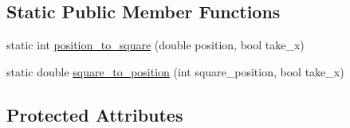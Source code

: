 \subsection*{Static Public Member Functions}
\begin{DoxyCompactItemize}
\item 
static int \hyperlink{classc__character_ae5c54984450cd668f8caff08bab773b9}{position\-\_\-to\-\_\-square} (double position, bool take\-\_\-x)
\item 
static double \hyperlink{classc__character_aef52e1c8a40484d9441867d10aa05b5f}{square\-\_\-to\-\_\-position} (int square\-\_\-position, bool take\-\_\-x)
\end{DoxyCompactItemize}
\subsection*{Protected Attributes}
